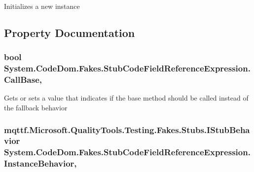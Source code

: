 Initializes a new instance



\subsection{Property Documentation}
\hypertarget{class_system_1_1_code_dom_1_1_fakes_1_1_stub_code_field_reference_expression_aae83f37aaec4b0629fc1ca60faf35eea}{
\subsubsection[{Call\-Base}]{\setlength{\rightskip}{0pt plus 5cm}bool System.\-Code\-Dom.\-Fakes.\-Stub\-Code\-Field\-Reference\-Expression.\-Call\-Base\hspace{0.3cm}{\ttfamily [get]}, {\ttfamily [set]}}}\label{class_system_1_1_code_dom_1_1_fakes_1_1_stub_code_field_reference_expression_aae83f37aaec4b0629fc1ca60faf35eea}


Gets or sets a value that indicates if the base method should be called instead of the fallback behavior

\hypertarget{class_system_1_1_code_dom_1_1_fakes_1_1_stub_code_field_reference_expression_a518cf596236d10b4d74ed636e156852f}{
\subsubsection[{Instance\-Behavior}]{\setlength{\rightskip}{0pt plus 5cm}mqttf.\-Microsoft.\-Quality\-Tools.\-Testing.\-Fakes.\-Stubs.\-I\-Stub\-Behavior System.\-Code\-Dom.\-Fakes.\-Stub\-Code\-Field\-Reference\-Expression.\-Instance\-Behavior\hspace{0.3cm}{\ttfamily [get]}, {\ttfamily [set]}}}\label{class_system_1_1_code_dom_1_1_fakes_1_1_stub_code_field_reference_expression_a518cf596236d10b4d74ed636e156852f}


